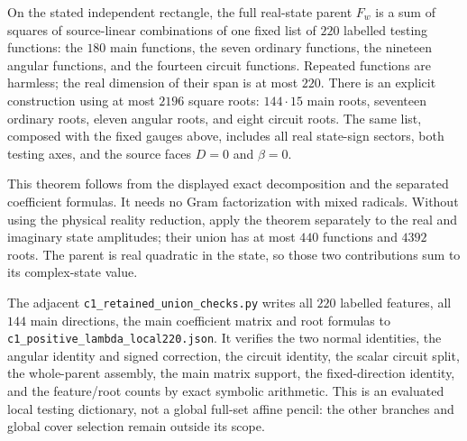 \begin{theorem}
On the stated independent rectangle, the full real-state parent
$F_w$ is a sum of squares of source-linear combinations of one
fixed list of $220$ labelled testing functions: the $180$ main
functions, the seven ordinary functions, the nineteen angular
functions, and the fourteen circuit functions. Repeated functions
are harmless; the real dimension of their span is at most $220$.
There is an explicit construction using at most $2196$ square
roots: $144\cdot15$ main roots, seventeen ordinary roots, eleven
angular roots, and eight circuit roots. The same list, composed
with the fixed gauges above, includes all real state-sign sectors,
both testing axes, and the source faces $D=0$ and $\beta=0$.
\end{theorem}

This theorem follows from the displayed exact decomposition and
the separated coefficient formulas. It needs no Gram factorization
with mixed radicals. Without using the physical reality reduction,
apply the theorem separately to the real and imaginary state
amplitudes; their union has at most $440$ functions and $4392$
roots. The parent is real quadratic in the state, so those two
contributions sum to its complex-state value.

The adjacent \texttt{c1\_retained\_union\_checks.py} writes all
$220$ labelled features, all $144$ main directions, the main
coefficient matrix and root formulas to
\texttt{c1\_positive\_lambda\_local220.json}. It verifies the two
normal identities, the angular identity and signed correction,
the circuit identity, the scalar circuit split, the whole-parent
assembly, the main matrix support, the fixed-direction identity,
and the feature/root counts by exact symbolic arithmetic.
This is an evaluated local testing dictionary, not a global
full-set affine pencil: the other branches and global cover
selection remain outside its scope.
